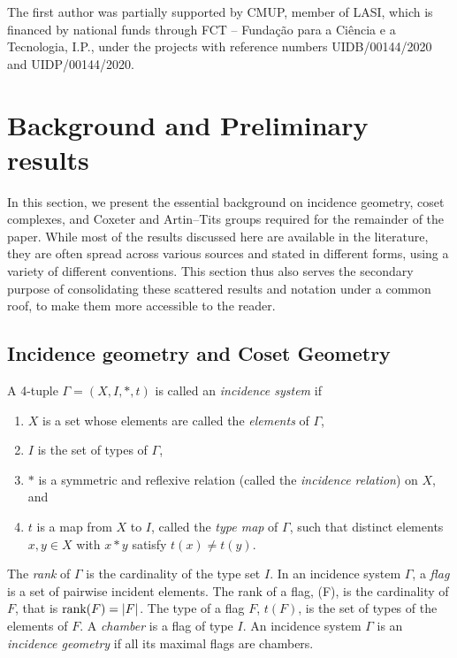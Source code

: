 \documentclass[11pt,letterpaper]{amsart}
\begin{document}
The first author was partially supported by CMUP, member of LASI, which is financed by national funds through FCT -- Funda\c c\~ao para a Ci\^encia e a Tecnologia, I.P., under the projects with reference numbers UIDB/00144/2020 and UIDP/00144/2020.

\section{Background and Preliminary results}\label{sec:prelims}

In this section, we present the essential background on incidence geometry, coset complexes, and Coxeter and Artin–Tits groups required for the remainder of the paper. While most of the results discussed here are available in the literature, they are often spread across various sources and stated in different forms, using a variety of different conventions. This section thus also serves the secondary purpose of consolidating these scattered results and notation under a common roof, to make them more accessible to the reader.
\subsection{Incidence geometry and Coset Geometry}
\label{sec:back:subsec:incidence}
    A 4-tuple $\Gamma = (X,I,*,t)$ is called an \textit{incidence system} if
    \begin{enumerate}
        \item $X$ is a set whose elements are called the \textit{elements} of $\Gamma$,
        \item $I$ is the set of types of $\Gamma$, 
        \item $*$ is a symmetric and reflexive relation (called the \textit{incidence relation}) on $X$, and
        \item $t$ is a map from $X$ to $I$, called the \textit{type map} of $\Gamma$, such that distinct elements $x,y \in X$ with $x * y$ satisfy $t(x) \neq t(y)$. 
    \end{enumerate}

The \textit{rank} of $\Gamma$ is the cardinality of the type set $I$.
In an incidence system $\Gamma$, a \textit{flag} is a set of pairwise incident elements. The rank of a flag, (F), is the cardinality of $F$, that is $\textnormal{rank}(F)=|F|$. The type of a flag $F$, $t(F)$, is the set of types of the elements of $F$. 
A \textit{chamber} is a flag of type $I$. An incidence system $\Gamma$ is an \textit{incidence geometry} if all its maximal flags are chambers.
\end{document}

